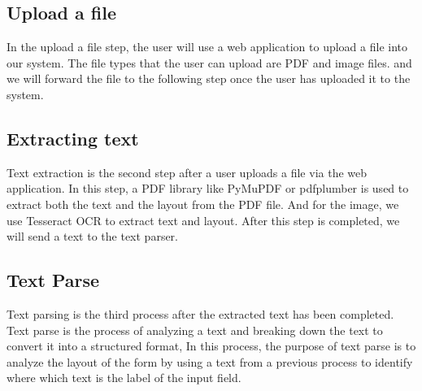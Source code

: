 \documentclass[12pt,oneside,openright,a4paper]{cpe-english-project}
\begin{document}
\subsection{Upload a file}

In the upload a file step, the user will use a web application to upload a file into our system. The file types that the user can upload are PDF and image files. and we will forward the file to the following step once the user has uploaded it to the system.


\subsection{Extracting text}

Text extraction is the second step after a user uploads a file via the web application. In this step, a PDF library like PyMuPDF or pdfplumber is used to extract both the text and the layout from the PDF file. And for the image, we use Tesseract OCR to extract text and layout. After this step is completed, we will send a text to the text parser.


\subsection{Text Parse}

Text parsing is the third process after the extracted text has been completed. Text parse is the process of analyzing a text and breaking down the text to convert it into a structured format, In this process, the purpose of text parse is to analyze the layout of the form by using a text from a previous process to identify where which text is the label of the input field.



\end{document}

